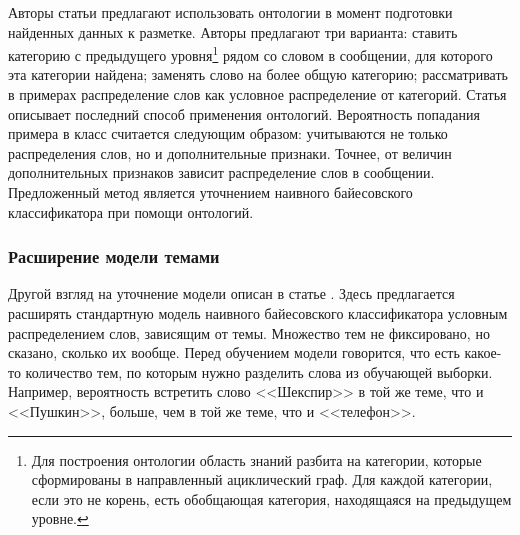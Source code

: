 Авторы статьи \cite{SaifHassanHeYulanAlani2012} предлагают использовать онтологии в момент
подготовки найденных данных к разметке. Авторы предлагают три варианта: ставить
категорию с предыдущего уровня\footnote{Для построения онтологии область знаний разбита на категории, которые сформированы в направленный
  ациклический граф. Для каждой категории, если это не корень, есть обобщающая категория,
  находящаяся на предыдущем уровне.}
рядом со словом в сообщении, для которого эта категории
найдена; заменять слово на более общую категорию; рассматривать в примерах распределение слов как
условное распределение от категорий. Статья описывает последний способ применения
онтологий. Вероятность попадания примера в класс считается следующим образом: учитываются не только
распределения слов, но и дополнительные признаки. Точнее, от величин дополнительных признаков
зависит распределение слов в сообщении. Предложенный метод является уточнением наивного байесовского
классификатора при помощи онтологий.

\subsubsection{Расширение модели темами}
Другой взгляд на уточнение модели описан в статье \cite{Celikyilmaz2010}. Здесь предлагается
расширять стандартную модель наивного байесовского классификатора условным распределением слов, зависящим
от темы. Множество тем не фиксировано, но сказано, сколько их вообще. Перед обучением модели
говорится, что есть какое-то количество тем, по которым нужно разделить слова из обучающей выборки. Например,
вероятность встретить слово <<Шекспир>> в той же теме, что и <<Пушкин>>, больше, чем в той же теме,
что и <<телефон>>.
